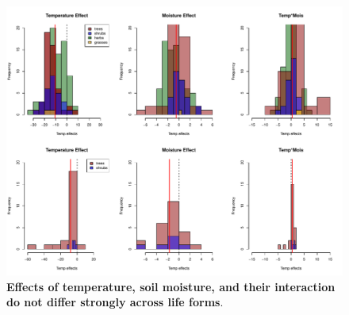 \documentclass{article}
\begin{document}
  
 \begin{figure}[h]
\centering
 \includegraphics{../../Analyses/soilmoisture/figures/histbbloform_spef.pdf}
 \caption{\textbf{Effects of temperature, soil moisture, and their interaction do not differ strongly across life forms}.}
 \label{fig:forms}
 \end{figure}

 
 
 
\end{document}

